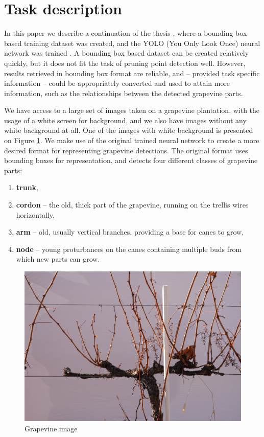 \documentclass{PSAIE}%
\begin{document}
\section{Task description} \label{sec_task_description}
In this paper we describe a continuation of the thesis \cite{bolyki_2021}, where a bounding box based training
dataset was created, and the YOLO (You Only Look Once) neural network was trained
\cite{glenn_jocher_2021_5563715}.
A bounding box based dataset can be created relatively quickly, but it does not fit the task of pruning
point detection well. However, results retrieved in bounding box format are reliable, and -- provided task
specific information -- could be appropriately converted and used to attain more information, such as
the relationships between the detected grapevine parts.

We have access to a large set of images taken on a grapevine plantation, with the usage of a white screen
for background, and we also have images without any white background at all. One of the images with
white background is presented on Figure \ref{fig_grapevine_image}.
We make use of the original \cite{bolyki_2021} trained neural network to create a more desired
format for representing grapevine detections. The original format uses bounding boxes for
representation, and detects four different classes of grapevine parts:
\begin{enumerate}
      \item \textbf{trunk},
      \item \textbf{cordon} -- the old, thick part of the grapevine, running on the trellis wires horizontally,
      \item \textbf{arm} -- old, usually vertical branches, providing a base for canes to grow,
      \item \textbf{node} -- young proturbances on the canes containing multiple buds from which new parts
            can grow.
\end{enumerate}

\begin{figure}[h]
      \centering
      \includegraphics[scale=0.08]{images/grapevine_image.jpg}
      \caption{Grapevine image}
      \label{fig_grapevine_image}
\end{figure}
\end{document}
